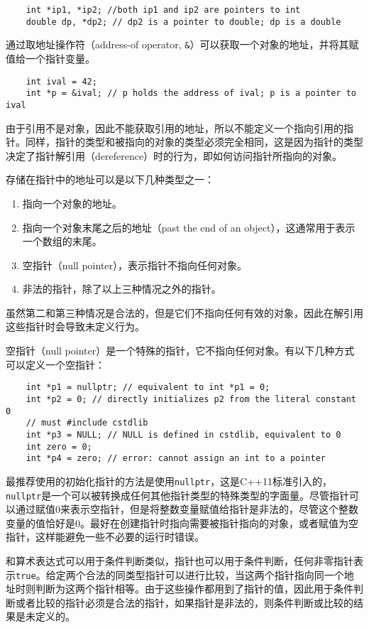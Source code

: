 \begin{verbatim}
    int *ip1, *ip2; //both ip1 and ip2 are pointers to int
    double dp, *dp2; // dp2 is a pointer to double; dp is a double
\end{verbatim}

通过取地址操作符（address-of operator, \texttt{&}）可以获取一个对象的地址，并将其赋值给一个指针变量。

\begin{verbatim}
    int ival = 42;
    int *p = &ival; // p holds the address of ival; p is a pointer to ival
\end{verbatim}

由于引用不是对象，因此不能获取引用的地址，所以不能定义一个指向引用的指针。同样，指针的类型和被指向的对象的类型必须完全相同，这是因为指针的类型决定了指针解引用（dereference）时的行为，即如何访问指针所指向的对象。

存储在指针中的地址可以是以下几种类型之一：

\begin{enumerate}
    \item 指向一个对象的地址。
    \item 指向一个对象末尾之后的地址（past the end of an object），这通常用于表示一个数组的末尾。
    \item 空指针（null pointer），表示指针不指向任何对象。
    \item 非法的指针，除了以上三种情况之外的指针。
\end{enumerate}

虽然第二和第三种情况是合法的，但是它们不指向任何有效的对象，因此在解引用这些指针时会导致未定义行为。

空指针（null pointer）是一个特殊的指针，它不指向任何对象。有以下几种方式可以定义一个空指针：

\begin{verbatim}
    int *p1 = nullptr; // equivalent to int *p1 = 0;
    int *p2 = 0; // directly initializes p2 from the literal constant 0
    // must #include cstdlib
    int *p3 = NULL; // NULL is defined in cstdlib, equivalent to 0
    int zero = 0;
    int *p4 = zero; // error: cannot assign an int to a pointer
\end{verbatim}

最推荐使用的初始化指针的方法是使用\texttt{nullptr}，这是C++11标准引入的，\texttt{nullptr}是一个可以被转换成任何其他指针类型的特殊类型的字面量。尽管指针可以通过赋值0来表示空指针，但是将整数变量赋值给指针是非法的，尽管这个整数变量的值恰好是0。最好在创建指针时指向需要被指针指向的对象，或者赋值为空指针，这样能避免一些不必要的运行时错误。

和算术表达式可以用于条件判断类似，指针也可以用于条件判断，任何非零指针表示\texttt{true}。给定两个合法的同类型指针可以进行比较，当这两个指针指向同一个地址时则判断为这两个指针相等。由于这些操作都用到了指针的值，因此用于条件判断或者比较的指针必须是合法的指针，如果指针是非法的，则条件判断或比较的结果是未定义的。

